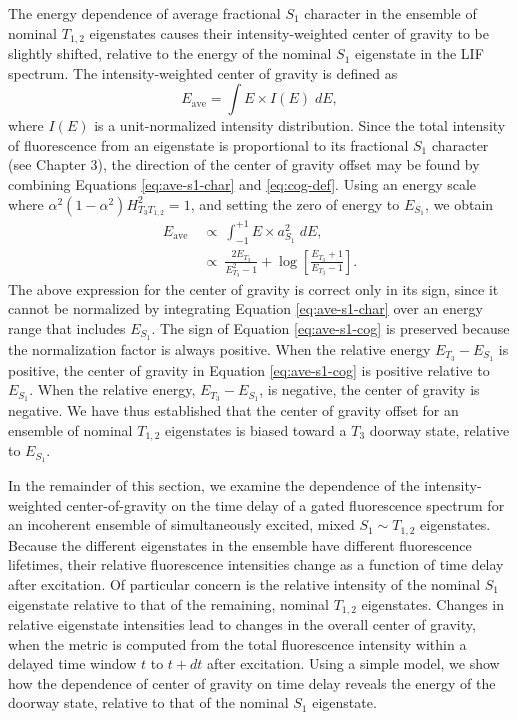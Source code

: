 The energy dependence of average fractional $S_1$ character in the
ensemble of nominal $T_{1,2}$ eigenstates causes their
intensity-weighted center of gravity to be slightly shifted, relative
to the energy of the nominal $S_1$ eigenstate in the LIF spectrum.
The intensity-weighted center of gravity is defined as
\begin{equation}
  \label{eq:cog-def}
  E_{\text{ave}} = \int E \times I(E) \; dE,
\end{equation}
where $I(E)$ is a unit-normalized intensity distribution.  Since the
total intensity of fluorescence from an eigenstate is proportional to
its fractional $S_1$ character (see Chapter 3), the direction of the
center of gravity offset may be found by combining Equations
\ref{eq:ave-s1-char} and \ref{eq:cog-def}.  Using an energy scale
where $\alpha^2 (1-\alpha^2) H_{T_3T_{1,2}}^2 = 1$, and setting the
zero of energy to $E_{S_1}$, we obtain
\begin{equation}
  \label{eq:ave-s1-cog}
  \begin{split}
    E_{\text{ave}} \: 
    &\propto \: \int_{-1}^{+1} E \times a_{S_1}^2 \; dE,\\
    &\propto \: \frac{2 E_{T_3}}{E_{T_3}^2 - 1} + \log
    \left[
      \frac{E_{T_3}+1}{E_{T_3}-1}
    \right].
  \end{split}
\end{equation}
The above expression for the center of gravity is correct only in its
sign, since it cannot be normalized by integrating Equation
\ref{eq:ave-s1-char} over an energy range that includes $E_{S_1}$.
The sign of Equation \ref{eq:ave-s1-cog} is preserved because the
normalization factor is always positive.  When the relative energy
$E_{T_3} - E_{S_1}$ is positive, the center of gravity in Equation
\ref{eq:ave-s1-cog} is positive relative to $E_{S_1}$.  When the
relative energy, $E_{T_3} - E_{S_1}$, is negative, the center of
gravity is negative.  We have thus established that the center of
gravity offset for an ensemble of nominal $T_{1,2}$ eigenstates is
biased toward a $T_3$ doorway state, relative to $E_{S_1}$.

In the remainder of this section, we examine the dependence of the
intensity-weighted center-of-gravity on the time delay of a gated
fluorescence spectrum for an incoherent ensemble of simultaneously
excited, mixed $S_1 \sim T_{1,2}$ eigenstates.  Because the different
eigenstates in the ensemble have different fluorescence lifetimes,
their relative fluorescence intensities change as a function of time
delay after excitation.  Of particular concern is the relative
intensity of the nominal $S_1$ eigenstate relative to that of the
remaining, nominal $T_{1,2}$ eigenstates.  Changes in relative
eigenstate intensities lead to changes in the overall center of
gravity, when the metric is computed from the total fluorescence
intensity within a delayed time window $t$ to $t+dt$ after excitation.
Using a simple model, we show how the dependence of center of gravity
on time delay reveals the energy of the doorway state, relative to
that of the nominal $S_1$ eigenstate.



